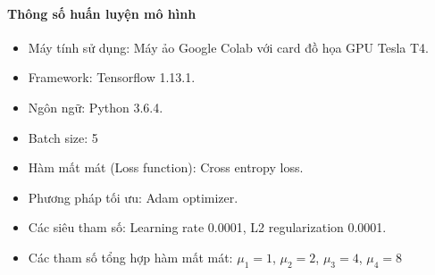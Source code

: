 \paragraph{Thông số huấn luyện mô hình}
\begin{itemize}
\item Máy tính sử dụng: Máy ảo Google Colab với card đồ họa GPU Tesla T4.
\item Framework: Tensorflow 1.13.1.
\item Ngôn ngữ: Python 3.6.4.
\item Batch size: 5
\item Hàm mất mát (Loss function): Cross entropy loss.
\item Phương pháp tối ưu: Adam optimizer.
\item Các siêu tham số: Learning rate 0.0001, L2 regularization 0.0001.
\item Các tham số tổng hợp hàm mất mát: $\mu_1 = 1$,  $\mu_2 = 2$,  $\mu_3 = 4$,  $\mu_4 = 8$
\end{itemize}
